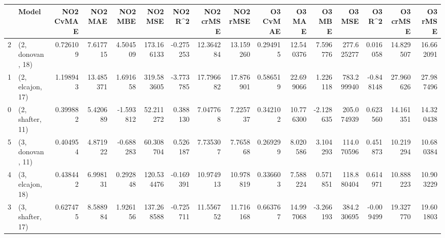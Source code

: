 \begin{tabular}{llrrrrrrrrrrrrrr}
\toprule
{} &             Model &  NO2 CvMAE &    NO2 MAE &   NO2 MBE &     NO2 MSE &   NO2 R\textasciicircum2 &  NO2 crMSE &   NO2 rMSE &  O3 CvMAE &     O3 MAE &    O3 MBE &      O3 MSE &    O3 R\textasciicircum2 &   O3 crMSE &    O3 rMSE \\
\midrule
2 &  (2, donovan, 18) &   0.726109 &   7.617715 &  4.504509 &  173.166133 & -0.275253 &  12.364284 &  13.159260 &  0.294915 &  12.540376 &  7.596776 &  277.625277 &  0.016058 &  14.829507 &  16.662091 \\
1 &  (2, elcajon, 17) &   1.198943 &  13.485371 &  1.691658 &  319.583605 & -3.773785 &  17.796682 &  17.876901 &  0.586519 &  22.699066 &  1.226118 &  783.299940 & -0.848148 &  27.960626 &  27.987496 \\
0 &  (2, shafter, 11) &   0.399882 &   5.420689 & -1.593812 &   52.211272 &  0.388130 &   7.047768 &   7.225737 &  0.342102 &  10.776300 & -2.128635 &  205.074939 &  0.623560 &  14.161351 &  14.320438 \\
5 &  (3, donovan, 11) &   0.404954 &   4.871922 & -0.688283 &   60.308704 &  0.526187 &   7.735307 &   7.765868 &  0.269299 &   8.020586 &  3.104293 &  114.070596 &  0.451873 &  10.219294 &  10.680384 \\
4 &  (3, elcajon, 18) &   0.438442 &   6.998131 &  0.292848 &  120.534476 & -0.169391 &  10.974913 &  10.978819 &  0.336603 &   7.588224 &  0.571851 &  118.880404 &  0.614971 &  10.888223 &  10.903229 \\
3 &  (3, shafter, 17) &   0.627475 &   8.588984 &  1.926156 &  137.268588 & -0.725711 &  11.556752 &  11.716168 &  0.663767 &  14.997068 & -3.266193 &  384.230695 & -0.009499 &  19.327770 &  19.601803 \\
\bottomrule
\end{tabular}
